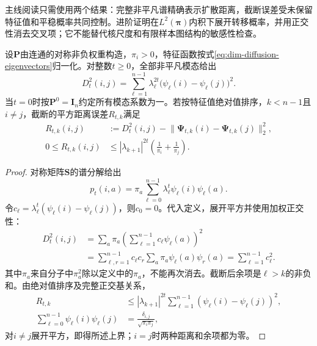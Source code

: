 主线阅读只需使用两个结果：完整非平凡谱精确表示扩散距离，截断误差受未保留特征值和平稳概率共同控制。进阶证明在$L^2(\bm{\pi})$内积下展开转移概率，并用正交性消去交叉项；它不能替代核尺度和有限样本图结构的敏感性检查。

\begin{theorem}[扩散距离的谱表示与截断界]
  \label{thm:dim-diffusion-isometry}
  设$\bm{P}$由连通的对称非负权重构造，$\pi_i>0$，特征函数按式\eqref{eq:dim-diffusion-eigenvectors}归一化。对整数$t\geq0$，全部非平凡模态给出
  \begin{equation}
    \label{eq:dim-diffusion-identity}
    D_t^2(i,j)
    =\sum_{\ell=1}^{n-1}\lambda_\ell^{2t}
      \bigl(\psi_\ell(i)-\psi_\ell(j)\bigr)^2.
  \end{equation}
  当$t=0$时按$\bm{P}^0=\bm{I}_n$约定所有模态系数为一。若按特征值绝对值排序，$k<n-1$且$i\ne j$，截断的平方距离误差$R_{t,k}$满足
  \begin{equation}
    \label{eq:dim-diffusion-tail}
    \begin{aligned}
      R_{t,k}(i,j)
        &:=D_t^2(i,j)
          -\lVert\bm{\Psi}_{t,k}(i)-\bm{\Psi}_{t,k}(j)\rVert_2^2,\\
      0\leq R_{t,k}(i,j)
        &\leq|\lambda_{k+1}|^{2t}
          \left(\frac1{\pi_i}+\frac1{\pi_j}\right).
    \end{aligned}
  \end{equation}
\end{theorem}
\begin{proof}
  对称矩阵$\bm{S}$的谱分解给出
  \[
    p_t(i,a)=\pi_a\sum_{\ell=0}^{n-1}
      \lambda_\ell^t\psi_\ell(i)\psi_\ell(a).
  \]
  令$c_\ell=\lambda_\ell^t(\psi_\ell(i)-\psi_\ell(j))$，则$c_0=0$。代入定义，展开平方并使用加权正交性：
  \[
    \begin{aligned}
      D_t^2(i,j)
        &=\sum_a\pi_a
          \left(\sum_{\ell=1}^{n-1}c_\ell\psi_\ell(a)\right)^2\\
        &=\sum_{\ell,r=1}^{n-1}c_\ell c_r
          \sum_a\pi_a\psi_\ell(a)\psi_r(a)
         =\sum_{\ell=1}^{n-1}c_\ell^2.
    \end{aligned}
  \]
  其中$\pi_a$来自分子中$\pi_a^2$除以定义中的$\pi_a$，不能再次消去。截断后余项是$\ell>k$的非负和。由绝对值排序及完整正交基关系，
  \[
    \begin{aligned}
      R_{t,k}
        &\leq|\lambda_{k+1}|^{2t}
          \sum_{\ell=1}^{n-1}
            (\psi_\ell(i)-\psi_\ell(j))^2,\\
      \sum_{\ell=0}^{n-1}\psi_\ell(i)\psi_\ell(j)
        &=\frac{\delta_{i,j}}{\sqrt{\pi_i\pi_j}},
    \end{aligned}
  \]
  对$i\ne j$展开平方，即得所述上界；$i=j$时两种距离和余项都为零。
\end{proof}

